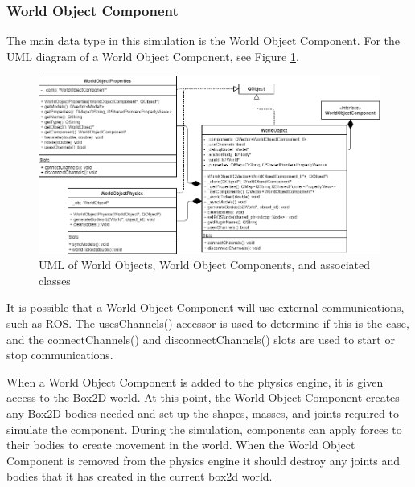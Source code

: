   \subsubsection*{World Object Component} \label{sec:worldobjclass}
	The main data type in this simulation is the World Object Component. For the UML diagram of a World Object Component, see Figure \ref{uml:worldobj}.
	
 \begin{figure}[h]
 	\begin{center}
 	\includegraphics[scale=0.5]{./images_design/uml/WorldObj}
 	\caption{UML of World Objects, World Object Components, and associated classes\label{uml:worldobj}}
 	\end{center}
 \end{figure}
	
	It is possible that a World Object Component will use external communications, such as ROS. The usesChannels() accessor is used to determine if this is the case, and the connectChannels() and disconnectChannels() slots are used to start or stop communications.
	
	When a World Object Component is added to the physics engine, it is given access to the Box2D world. At this point, the World Object Component creates any Box2D bodies needed and set up the shapes, masses, and joints required to simulate the component. During the simulation, components can apply forces to their bodies to create movement in the world. When the World Object Component is removed from the physics engine it should destroy any joints and bodies that it has created in the current box2d world.

